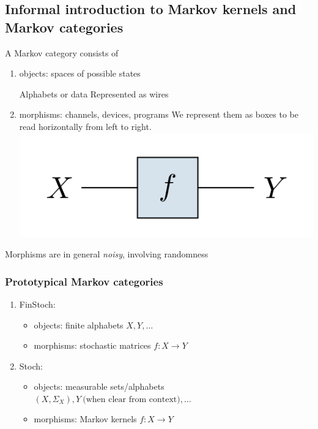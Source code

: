 % 
%
%

\subsection{Informal introduction to Markov kernels and Markov categories}

\begin{frame}[c]
    A Markov category consists of
    \begin{enumerate}
        \item objects: spaces of possible states\par
            Alphabets or data
            Represented as wires
        \item morphisms: channels, devices, programs
            We represent them as boxes to be read horizontally from left to right.
            \includegraphics[width=.4\textwidth]{graphics/string/markov_morphism.png}
    \end{enumerate}
    Morphisms are in general \emph{noisy}, involving randomness
\end{frame}

\begin{frame}
    \frametitle{Prototypical Markov categories}
    \begin{enumerate}
        \item FinStoch: 
            \begin{itemize}
                \item objects: finite alphabets $X, Y, \dots$
                \item morphisms: stochastic matrices $f: X\to Y$
            \end{itemize}
        \item Stoch: 
            \begin{itemize}
                \item objects: measurable sets/alphabets $(X, \Sigma_X), Y\ \text{(when clear from context)}, \dots$
                \item morphisms: Markov kernels $f: X\to Y$
            \end{itemize}
    \end{enumerate}
\end{frame}


